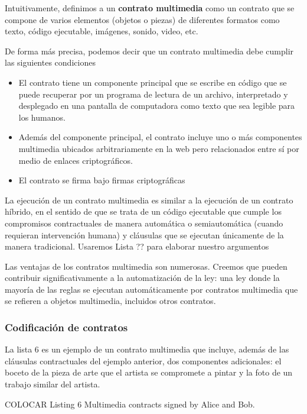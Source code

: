 \documentclass[12pt]{report} %
\begin{document}
\begin{itemize}
Intuitivamente, definimos a un \textbf{contrato multimedia} como un contrato que se compone de varios elementos (objetos o piezas) de diferentes formatos como texto, código ejecutable, imágenes, sonido, video, etc.

De forma más precisa, podemos decir que un contrato multimedia debe cumplir las siguientes condiciones

\begin{itemize}
    \item El contrato tiene un componente principal que se escribe en código que se puede recuperar por un programa de lectura de un archivo, interpretado y desplegado en una pantalla de computadora como texto que sea legible para los humanos.

    \item Además del componente principal, el contrato incluye uno o más componentes multimedia  ubicados arbitrariamente en la web pero relacionados entre sí por medio de enlaces criptográficos.

    \item El contrato se firma bajo firmas criptográficas
\end{itemize}

La ejecución de un contrato multimedia es similar a la ejecución de un contrato híbrido, en el sentido de que se trata de un código ejecutable que cumple los compromisos contractuales de manera automática o semiautomática (cuando requieran intervención humana)  y cláusulas que se ejecutan únicamente de la manera tradicional. Usaremos Lista ?? para elaborar nuestro argumentos

Las ventajas de los contratos multimedia son numerosas. Creemos que pueden contribuir significativamente a la automatización de la ley: una ley donde la mayoría de las reglas se ejecutan automáticamente por contratos multimedia que se refieren a objetos multimedia, incluidos otros contratos.

\subsubsection{Codificación de contratos}
La lista 6 es un ejemplo de un contrato multimedia que incluye, además de las cláusulas contractuales del ejemplo anterior, dos componentes adicionales: el boceto de la pieza de arte que el artista se compromete a pintar y la foto de un trabajo similar del artista.

COLOCAR Listing 6 Multimedia contracts signed by Alice and Bob.


\end{itemize}
\end{document}
